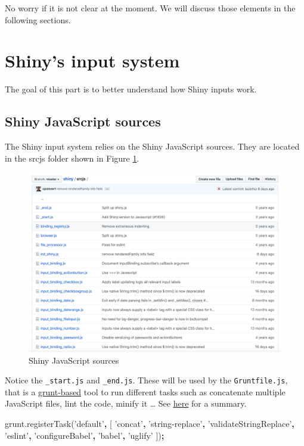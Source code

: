 \documentclass[]{book}
\newenvironment{Shaded}{\begin{snugshade}}{\end{snugshade}}
\newcommand{\AttributeTok}[1]{\textcolor[rgb]{0.77,0.63,0.00}{#1}}
\newcommand{\NormalTok}[1]{#1}
\newcommand{\OperatorTok}[1]{\textcolor[rgb]{0.81,0.36,0.00}{\textbf{#1}}}
\newcommand{\StringTok}[1]{\textcolor[rgb]{0.31,0.60,0.02}{#1}}
\newcommand{\VariableTok}[1]{\textcolor[rgb]{0.00,0.00,0.00}{#1}}
\begin{document}
No worry if it is not clear at the moment. We will discuss those elements in the following sections.

\hypertarget{shinys-input-system}{%
\section{Shiny's input system}\label{shinys-input-system}}

The goal of this part is to better understand how Shiny inputs work.

\hypertarget{shiny-javascript-sources}{%
\subsection{Shiny JavaScript sources}\label{shiny-javascript-sources}}

The Shiny input system relies on the Shiny JavaScript sources. They are located in the srcjs folder shown in Figure \ref{fig:shiny-js-sources}.

\begin{figure}
\includegraphics[width=32.08in]{images/survival-kit/shiny-js-sources} \caption{Shiny JavaScript sources}\label{fig:shiny-js-sources}
\end{figure}

Notice the \texttt{\_start.js} and \texttt{\_end.js}. These will be used by the \texttt{Gruntfile.js}, that is a \href{https://gruntjs.com}{grunt-based} tool to run different tasks such as concatenate multiple JavaScript files, lint the code, minify it \ldots{} See \href{https://github.com/rstudio/shiny/tree/master/tools}{here} for a summary.

\begin{Shaded}
\begin{Highlighting}[]
\VariableTok{grunt}\NormalTok{.}\AttributeTok{registerTask}\NormalTok{(}\StringTok{'default'}\OperatorTok{,}\NormalTok{ [}
\StringTok{'concat'}\OperatorTok{,}
\StringTok{'string-replace'}\OperatorTok{,}
\StringTok{'validateStringReplace'}\OperatorTok{,}
\StringTok{'eslint'}\OperatorTok{,}
\StringTok{'configureBabel'}\OperatorTok{,}
\StringTok{'babel'}\OperatorTok{,}
\StringTok{'uglify'}
\NormalTok{])}\OperatorTok{;}
\end{Highlighting}
\end{Shaded}
\end{document}
